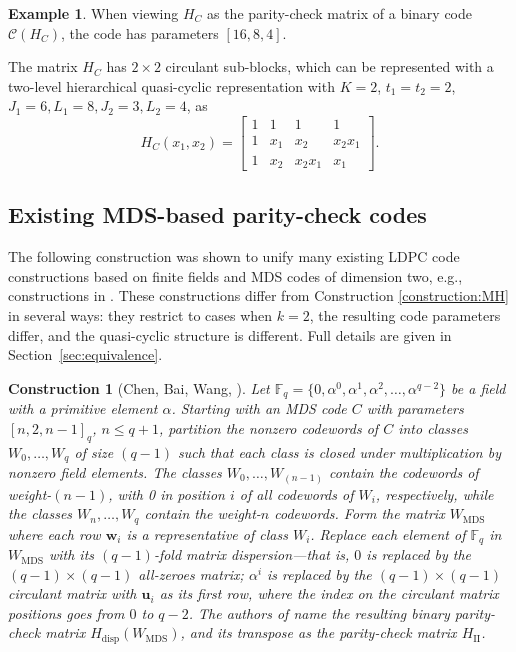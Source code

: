 \documentclass[11pt]{amsart}
\newtheorem{construction}{Construction}
\theoremstyle{definition}
\newtheorem{example}[theorem]{Example}
\newcommand{\0}{\mathbf{0}}
\newcommand{\F}{\mathbb{F}}
\begin{document}
\begin{example}
When viewing $H_C$ as the parity-check matrix of a binary code $\mathcal{C}(H_C)$, the code has parameters $[16,8,4]$.

The matrix $H_C$ has $2\times 2$ circulant sub-blocks, which can be represented with a two-level hierarchical quasi-cyclic representation with $K=2$, $t_1=t_2=2$, $J_1=6, L_1=8, J_2=3, L_2=4$,
as 
\[ H_C(x_1, x_2) = \begin{bmatrix} 1 & 1& 1& 1\\ 
1& x_1& x_2 & x_2x_1\\
1& x_2 & x_2x_1 & x_1 \end{bmatrix}. \]
\end{example}

\subsection{Existing MDS-based parity-check codes}

The following construction \cite{chen2010two} was shown to unify many existing LDPC code constructions based on finite fields and MDS codes of dimension two, e.g., constructions in \cite{lan2007construction, song2009unified, lin2006algebraic, lan2005constructions}. These constructions differ from Construction \ref{construction:MH} in several ways: they restrict to cases when $k=2$,  the resulting code parameters differ, and the quasi-cyclic structure is different. Full details are given in Section~\ref{sec:equivalence}. 


\begin{construction}[Chen, Bai, Wang, \cite{chen2010two}] \label{construction:LDPC}
Let $\F_q=\{0, \alpha^{0}, \alpha^1, \alpha^2, \ldots, \alpha^{q-2}\}$
be a field with a primitive element $\alpha$.  
Starting with an MDS code $C$ with parameters $[n, 2, n-1]_q$, $n\leq q+1$, partition the nonzero codewords of $C$ into classes $W_0, \ldots, W_q$ of size $(q-1)$ such that each class is closed under multiplication by nonzero field elements. The classes $W_0, \ldots, W_{(n-1)}$ contain the codewords of weight-$(n-1)$, with 0 in position $i$ of all codewords of $W_i$, respectively,  while the classes $W_{n}, \ldots, W_q$ contain the weight-$n$ codewords.
Form the matrix $W_{\text{MDS}}$ where each row $\mathbf{w}_i$ is a  representative of class $W_i$. Replace each element of $\F_q$ in $W_{\text{MDS}}$ with its $(q-1)$-fold matrix dispersion---that is,  $0$ is replaced by the $(q-1)\times(q-1)$ all-zeroes matrix; $\alpha^i$ is replaced by the $(q-1)\times(q-1)$ circulant matrix with $\textbf{u}_i$ as its first row, where the index on the circulant matrix positions goes from $0$ to $q-2$. The authors of \cite{chen2010two} name the resulting binary parity-check matrix $H_{\text{disp}}(W_{\text{MDS}})$, and its transpose as the parity-check matrix $H_{\text{II}}$.  
\end{construction}
\end{document}
